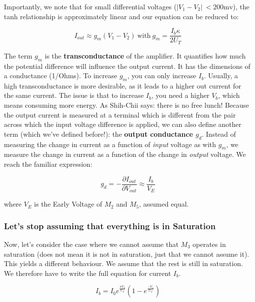 Importantly, we note that for small differential voltages ($|V_1 - V_2|\ < 200 \textrm{mv}$), the tanh relationship is approximately linear and our equation can be reduced to: 

\begin{equation}
    I_{out} \approx g_m(V_1 - V_2) \ \mathrm{with} \ g_m = \frac{I_b \kappa}{2 U_T}
\end{equation}

The term $g_m$ is the \textbf{transconductance} of the amplifier. It quantifies how much the potential difference will influence the output current. It has the dimensions of a conductance (1/Ohms). To increase $g_m$, you can only increase $I_b$. Usually, a high transconductance is more desirable, as it leads to a higher out current for the same current. The issue is that to increase $I_b$, you need a higher $V_b$, which means consuming more energy. As Shih-Chii says: there is no free lunch!
Because the output current is measured at a terminal which is different from the pair across which the input voltage difference is applied, we can also define another term (which we've defined before!): the \textbf{output conductance $g_d$}. Instead of measuring the change in current as a function of \textit{input} voltage as with $g_m$, we measure the change in current as a function of the change in \textit{output} voltage. We reach the familiar expression: 

\begin{equation}
    g_d = - \frac{\partial I_{out}}{\partial V_{out}} \approx \frac{I_b}{V_E}
\end{equation}

where $V_E$ is the Early Voltage of $M_2$ and $M_5$, assumed equal. 

\subsubsection{Let's stop assuming that everything is in Saturation}

Now, let's consider the case where we cannot assume that $M_3$ operates in saturation (does not mean it is not in saturation, just that we cannot assume it). This yields a different behaviour. We assume that the rest is still in saturation. We therefore have to write the full equation for current $I_b$.

\begin{equation}
    I_b = I_0 e^{\frac{\kappa V_b}{U_T}}(1 - e^{\frac{-V_s}{U_T}})
\end{equation}

